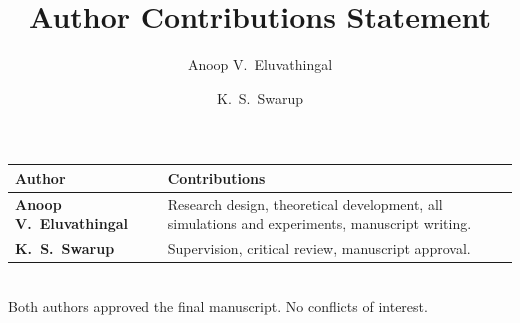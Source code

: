 \documentclass[11pt,a4paper]{article}
\title{Author Contributions Statement}
\author{Anoop V.\ Eluvathingal \and K.\ S.\ Swarup}
\date{}
\begin{document}
\maketitle\thispagestyle{empty}
\begin{tabular}{@{}>{\bfseries}p{3.8cm}p{10cm}@{}}
\toprule
Author & Contributions \\ \midrule
Anoop V.\ Eluvathingal & Research design, theoretical development, all simulations and experiments, manuscript writing. \\[6pt]
K.\ S.\ Swarup & Supervision, critical review, manuscript approval. \\
\bottomrule
\end{tabular}\\[8pt]
Both authors approved the final manuscript. No conflicts of interest.
\end{document}
